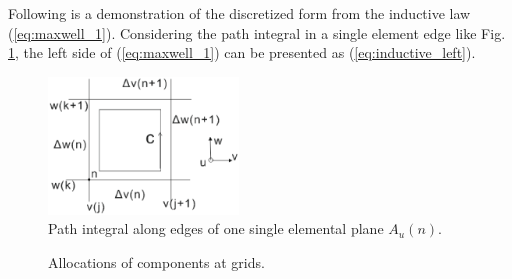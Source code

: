 
Following is a demonstration of the discretized form from the inductive law (\ref{eq:maxwell_1}). Considering the path integral in a single element edge like Fig.  \ref{fig:FIT_max_integral1}, the left side of (\ref{eq:maxwell_1}) can be presented as  (\ref{eq:inductive_left}). 

\begin{figure}[!ht]
\centering
\includegraphics[width=0.45\textwidth]{bilder/FIT_max_integral1}
\caption{ Path integral along edges of one single elemental plane $A_{u}(n)$\cite{ script_FeldSim}.}
\label{fig:FIT_max_integral1}
\end{figure}

\begin{figure}[!ht]
\centering
{}
\hfill
{}
\caption{Allocations of components at grids\cite{ script_FeldSim}.}
\end{figure}

